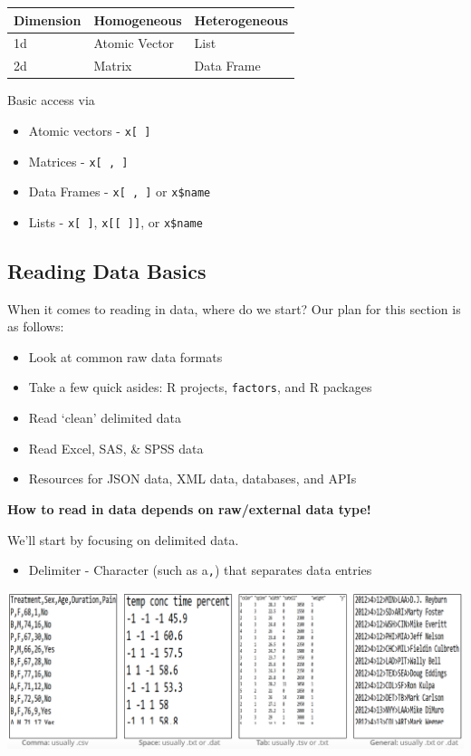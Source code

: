 \documentclass[
]{book}
\providecommand{\tightlist}{%
  \setlength{\itemsep}{0pt}\setlength{\parskip}{0pt}}
\theoremstyle{definition}
\theoremstyle{definition}
\theoremstyle{definition}
\theoremstyle{remark}
\begin{document}
\begin{longtable}[]{@{}lll@{}}
\toprule
Dimension & Homogeneous & Heterogeneous\tabularnewline
\midrule
\endhead
1d & Atomic Vector & List\tabularnewline
2d & Matrix & Data Frame\tabularnewline
\bottomrule
\end{longtable}

Basic access via

\begin{itemize}
\item
  Atomic vectors - \texttt{x{[}\ {]}}
\item
  Matrices - \texttt{x{[}\ ,\ {]}}
\item
  Data Frames - \texttt{x{[}\ ,\ {]}} or \texttt{x\$name}
\item
  Lists - \texttt{x{[}\ {]}}, \texttt{x{[}{[}\ {]}{]}}, or \texttt{x\$name}
\end{itemize}

\hypertarget{reading-data-basics}{%
\subsection{Reading Data Basics}\label{reading-data-basics}}

When it comes to reading in data, where do we start? Our plan for this section is as follows:

\begin{itemize}
\item
  Look at common raw data formats
\item
  Take a few quick asides: R projects, \texttt{factors}, and R packages
\item
  Read `clean' delimited data
\item
  Read Excel, SAS, \& SPSS data
\item
  Resources for JSON data, XML data, databases, and APIs
\end{itemize}

\textbf{How to read in data depends on raw/external data type!}

We'll start by focusing on delimited data.

\begin{itemize}
\tightlist
\item
  Delimiter - Character (such as a\texttt{,}) that separates data entries
\end{itemize}

\begin{center}\includegraphics[width=0.8\linewidth]{img/delimitedData} \end{center}
\end{document}
